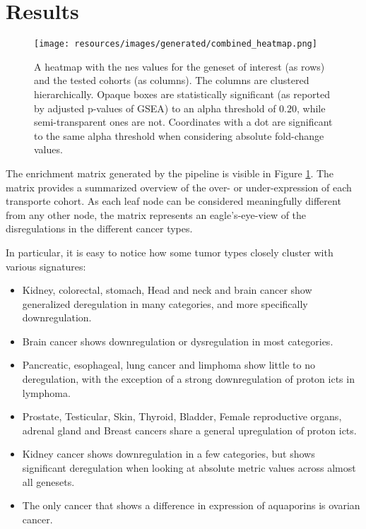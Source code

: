 \section{Results}

\begin{figure}
    \centering
    \texttt{[image: resources/images/generated/combined\_heatmap.png]}
    \caption{\small A heatmap with the \gls{nes} values for the geneset of interest (as rows) and the tested cohorts (as columns). The columns are clustered hierarchically. Opaque boxes are statistically significant (as reported by adjusted p-values of GSEA) to an alpha threshold of $0.20$, while semi-transparent ones are not. Coordinates with a dot are significant to the same alpha threshold when considering absolute fold-change values.}
    \label{fig:full_enrichment_heatmap}
\end{figure}

The enrichment matrix generated by the pipeline is visible in Figure \ref{fig:full_enrichment_heatmap}.
The matrix provides a summarized overview of the over- or under-expression of each transporte cohort.
As each leaf node can be considered meaningfully different from any other node, the matrix represents an eagle's-eye-view of the disregulations in the different cancer types.

In particular, it is easy to notice how some tumor types closely cluster with various signatures:
\begin{itemize}
    \item Kidney, colorectal, stomach, Head and neck and brain cancer show generalized deregulation in many categories, and more specifically downregulation.
    \item Brain cancer shows downregulation or dysregulation in most categories.
    \item Pancreatic, esophageal, lung cancer and limphoma show little to no deregulation, with the exception of a strong downregulation of proton \glspl{ict} in lymphoma.
    \item Prostate, Testicular, Skin, Thyroid, Bladder, Female reproductive organs, adrenal gland and Breast cancers share a general upregulation of proton \glspl{ict}.
    \item Kidney cancer shows downregulation in a few categories, but shows significant deregulation when looking at absolute metric values across almost all genesets.
    \item The only cancer that shows a difference in expression of aquaporins is ovarian cancer.
\end{itemize}

